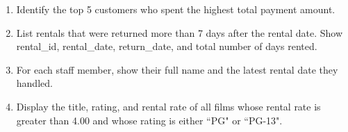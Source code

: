 \documentclass[12pt,a4paper]{article}
\newif\ifshowsolutions
\begin{document}
\begin{enumerate}
\item Identify the top 5 customers who spent the highest total payment amount.

\ifshowsolutions
\textbf{Solution:}
\begin{lstlisting}[language=SQL]
SELECT c.first_name, c.last_name, SUM(p.amount) AS total_paid
FROM customer c
JOIN payment p ON c.customer_id = p.customer_id
GROUP BY c.customer_id
ORDER BY total_paid DESC
LIMIT 5;
\end{lstlisting}
\fi


\item List rentals that were returned more than 7 days after the rental date.
Show rental\_id, rental\_date, return\_date, and total number of days rented.

\ifshowsolutions
\textbf{Solution:}
\begin{lstlisting}[language=SQL]
SELECT rental_id, rental_date, return_date, return_date - rental_date AS days_rented
FROM rental
WHERE return_date - rental_date > INTERVAL '7 days';
\end{lstlisting}
\fi


\item For each staff member, show their full name and the latest rental date they handled.

\ifshowsolutions
\textbf{Solution:}
\begin{lstlisting}[language=SQL]
SELECT s.first_name || ' ' || s.last_name AS staff_name, MAX(r.rental_date) AS latest_rental
FROM staff s
JOIN rental r ON s.staff_id = r.staff_id
GROUP BY s.staff_id;
\end{lstlisting}
\fi


\item Display the title, rating, and rental rate of all films whose rental rate is greater than 4.00 and whose rating is either ``PG" or ``PG-13".

\ifshowsolutions
\textbf{Solution:}
\begin{lstlisting}[language=SQL]
SELECT title, rating, rental_rate
FROM film
WHERE rental_rate > 4.00 AND rating IN ('PG', 'PG-13');
\end{lstlisting}
\fi



\end{enumerate}
\end{document}
